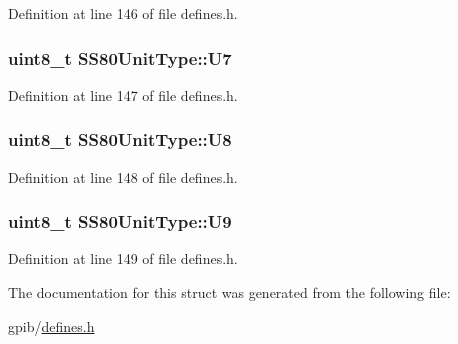 Definition at line 146 of file defines.\+h.

\subsubsection[{\texorpdfstring{U7}{U7}}]{\setlength{\rightskip}{0pt plus 5cm}uint8\+\_\+t S\+S80\+Unit\+Type\+::\+U7}\hypertarget{structSS80UnitType_a7b2386c546a650681e1b91215b06a42a}{}\label{structSS80UnitType_a7b2386c546a650681e1b91215b06a42a}


Definition at line 147 of file defines.\+h.

\subsubsection[{\texorpdfstring{U8}{U8}}]{\setlength{\rightskip}{0pt plus 5cm}uint8\+\_\+t S\+S80\+Unit\+Type\+::\+U8}\hypertarget{structSS80UnitType_a9179b2db6d9a77eb6fa614e8144ed4e2}{}\label{structSS80UnitType_a9179b2db6d9a77eb6fa614e8144ed4e2}


Definition at line 148 of file defines.\+h.

\subsubsection[{\texorpdfstring{U9}{U9}}]{\setlength{\rightskip}{0pt plus 5cm}uint8\+\_\+t S\+S80\+Unit\+Type\+::\+U9}\hypertarget{structSS80UnitType_a8db227e978903c9ae3923225b86c0609}{}\label{structSS80UnitType_a8db227e978903c9ae3923225b86c0609}


Definition at line 149 of file defines.\+h.



The documentation for this struct was generated from the following file\+:\begin{DoxyCompactItemize}
\item 
gpib/\hyperlink{defines_8h}{defines.\+h}\end{DoxyCompactItemize}
